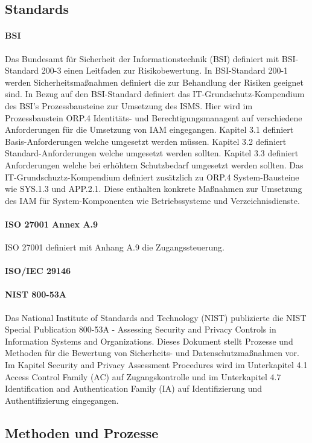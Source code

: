 \documentclass[10pt]{article}
\begin{document}
\subsection{Standards}
\paragraph{BSI}
Das Bundesamt für Sicherheit der Informationstechnik (BSI) definiert mit BSI-Standard 200-3 einen Leitfaden zur Risikobewertung. In BSI-Standard 200-1 werden Sicherheitsmaßnahmen definiert die zur Behandlung der Risiken geeignet sind. In Bezug auf den BSI-Standard definiert das IT-Grundschutz-Kompendium des BSI's Prozessbausteine zur Umsetzung des ISMS. Hier wird im Prozessbaustein \glqq{}ORP.4 Identitäts- und Berechtigungsmanagent\grqq{} auf verschiedene Anforderungen für die Umsetzung von IAM eingegangen. Kapitel 3.1 definiert Basis-Anforderungen welche umgesetzt werden müssen. Kapitel 3.2 definiert Standard-Anforderungen welche umgesetzt werden sollten. Kapitel 3.3 definiert Anforderungen welche bei erhöhtem Schutzbedarf umgesetzt werden sollten. Das IT-Grundschuztz-Kompendium definiert zusätzlich zu ORP.4 System-Bausteine wie SYS.1.3 und APP.2.1. Diese enthalten konkrete Maßnahmen zur Umsetzung des IAM für System-Komponenten wie Betriebssysteme und Verzeichnisdienste.
\paragraph{ISO 27001 Annex A.9}
ISO 27001 definiert mit Anhang A.9 die Zugangssteuerung.
\paragraph{ISO/IEC 29146}
\paragraph{NIST 800-53A}
Das National Institute of Standards and Technology (NIST) publizierte die \glqq{}NIST Special Publication 800-53A - Assessing Security and Privacy Controls in Information Systems and Organizations\grqq{}. Dieses Dokument stellt Prozesse und Methoden für die Bewertung von Sicherheits- und Datenschutzmaßnahmen vor. Im Kapitel \glqq{}Security and Privacy Assessment Procedures\grqq{} wird im Unterkapitel 4.1 \glqq{}Access Control Family (AC)\grqq{} auf Zugangskontrolle und im Unterkapitel 4.7 \glqq{}Identification and Authentication Family (IA)\grqq{} auf Identifizierung und Authentifizierung eingegangen.
\subsection{Methoden und Prozesse}
\end{document}

